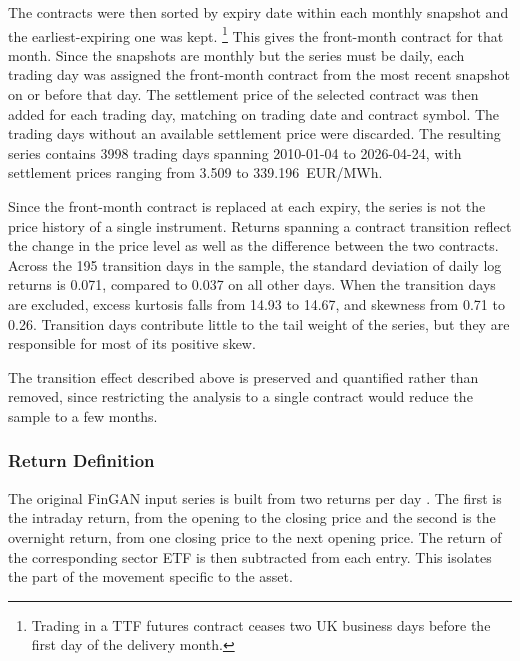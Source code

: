 The contracts were then sorted by expiry date within each monthly snapshot and the earliest-expiring one was kept. \footnote{Trading in a TTF futures
contract ceases two UK business days before the first day of the delivery month.} This gives the front-month contract for that month. Since the snapshots are monthly but the series must be daily, each trading day was assigned the front-month contract from the most recent snapshot on or before that day.
The settlement price of the selected contract was then added for each trading day, matching on trading date and contract symbol. The trading days without an available settlement price were discarded. The resulting series contains \num{3998} trading days spanning 2010-01-04 to 2026-04-24, with settlement prices ranging from \num{3.509} to \num{339.196}~EUR/MWh.

Since the front-month contract is replaced at each expiry, the series is not the price history of a single instrument. Returns spanning a contract transition reflect the change in the price level as well as the difference between the two contracts. Across the \num{195} transition days in the sample, the standard deviation of daily log returns is \num{0.071}, compared to \num{0.037} on all other days. When the transition days are excluded, excess kurtosis falls from \num{14.93} to \num{14.67}, and skewness from \num{0.71} to \num{0.26}. Transition days contribute little to the tail weight of the series, but they are responsible for most of its positive skew. 

The transition effect described above is preserved and quantified rather than removed, since restricting the analysis to a single contract would reduce the sample to a few months.


\subsubsection{Return Definition}\label{sec:return-definition}
The original FinGAN input series is built from two returns per day \parencite{vuleticFinGANForecastingClassifying2024}. The first is the intraday return, from the opening to the closing price and the second is the overnight return, from one closing price to the next opening
price. The return of the corresponding sector ETF is then subtracted from each entry. This isolates the part of the movement specific to the asset.

